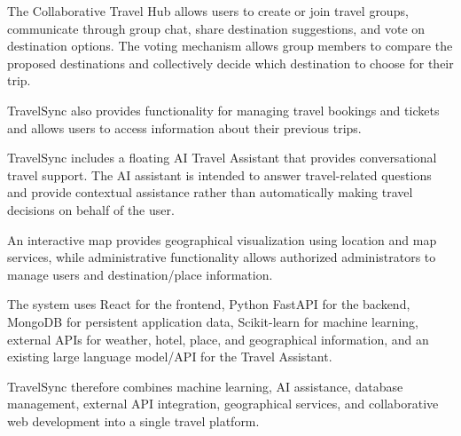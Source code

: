 \documentclass[11pt,a4paper]{article}
\begin{document}
The Collaborative Travel Hub allows users to create or join travel groups, communicate through group chat, share destination suggestions, and vote on destination options. The voting mechanism allows group members to compare the proposed destinations and collectively decide which destination to choose for their trip.

TravelSync also provides functionality for managing travel bookings and tickets and allows users to access information about their previous trips.

TravelSync includes a floating AI Travel Assistant that provides conversational travel support. The AI assistant is intended to answer travel-related questions and provide contextual assistance rather than automatically making travel decisions on behalf of the user.

An interactive map provides geographical visualization using location and map services, while administrative functionality allows authorized administrators to manage users and destination/place information.

The system uses React for the frontend, Python FastAPI for the backend, MongoDB for persistent application data, Scikit-learn for machine learning, external APIs for weather, hotel, place, and geographical information, and an existing large language model/API for the Travel Assistant.

TravelSync therefore combines machine learning, AI assistance, database management, external API integration, geographical services, and collaborative web development into a single travel platform.
\end{document}
